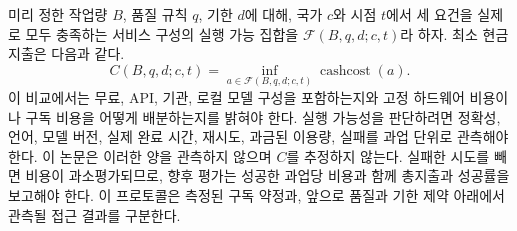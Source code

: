 \documentclass[11pt]{article}
\theoremstyle{definition}
\theoremstyle{remark}
\begin{document}
미리 정한 작업량 $B$, 품질 규칙 $q$, 기한 $d$에 대해, 국가 $c$와 시점 $t$에서 세 요건을 실제로 모두 충족하는 서비스 구성의 실행 가능 집합을 $\mathcal F(B,q,d;c,t)$라 하자. 최소 현금 지출은 다음과 같다.
\[
C(B,q,d;c,t)=\inf_{a\in\mathcal F(B,q,d;c,t)}\operatorname{cashcost}(a).
\]
이 비교에서는 무료, API, 기관, 로컬 모델 구성을 포함하는지와 고정 하드웨어 비용이나 구독 비용을 어떻게 배분하는지를 밝혀야 한다. 실행 가능성을 판단하려면 정확성, 언어, 모델 버전, 실제 완료 시간, 재시도, 과금된 이용량, 실패를 과업 단위로 관측해야 한다. 이 논문은 이러한 양을 관측하지 않으며 $C$를 추정하지 않는다. 실패한 시도를 빼면 비용이 과소평가되므로, 향후 평가는 성공한 과업당 비용과 함께 총지출과 성공률을 보고해야 한다. 이 프로토콜은 측정된 구독 약정과, 앞으로 품질과 기한 제약 아래에서 관측될 접근 결과를 구분한다.
\end{document}
